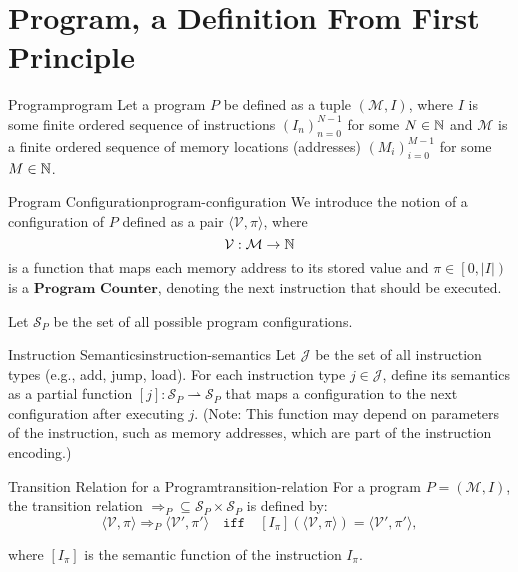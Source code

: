 \section{Program, a Definition From First Principle}
\label{sec:Program-Definition}

\begin{definition}{Program}{program}
	Let a program $P$ be defined as a tuple $(\mathcal{M}, I)$, where $I$ is some finite ordered
	sequence of instructions $(I_{n})_{n=0}^{N-1}$ for some $N \in \mathbb{N}$ and $\mathcal{M}$ is a 
	finite ordered sequence of memory locations (addresses) $(M_i)_{i=0}^{M-1}$ for some $M \in \mathbb{N}$.
\end{definition}

\begin{definition}{Program Configuration}{program-configuration}
	We introduce the notion of a configuration of $P$ defined as a pair 
	$\langle\mathcal{V}, \pi\rangle$, where $$\mathcal{V} : \mathcal{M} \to \mathbb{N}$$ is a function
	that maps each memory address to its stored value and $\pi\in\left[0,|I|\right)$ is a 
	$\textbf{Program Counter}$, denoting the next instruction that should be executed. 
	
	\vspace{1em}
	
	Let $\mathcal{S}_P$ be the set of all possible program configurations.
\end{definition}

\begin{definition}{Instruction Semantics}{instruction-semantics}
	Let $\mathcal{J}$ be the set of all instruction types (e.g., add, jump, load). For each instruction type $j \in \mathcal{J}$, define its semantics as a partial function $[j] : \mathcal{S}_P \rightharpoonup \mathcal{S}_P$ that maps a configuration to the next configuration after executing $j$. (Note: This function may depend on parameters of the instruction, such as memory addresses, which are part of the instruction encoding.)
\end{definition}

\begin{definition}{Transition Relation for a Program}{transition-relation}
	For a program $P = (\mathcal{M}, I)$, the transition relation $\Rightarrow_P \subseteq \mathcal{S}_P \times \mathcal{S}_P$ is defined by:
	$$\langle \mathcal{V}, \pi\rangle \Rightarrow_P \langle\mathcal{V}',\pi'\rangle \hspace{1em} \texttt{iff} \hspace{1em} [I_{\pi}](\langle\mathcal{V}, \pi\rangle) = \langle\mathcal{V}',\pi'\rangle,$$
	
	where $[I_\pi]$ is the semantic function of the instruction $I_\pi$.
\end{definition}

